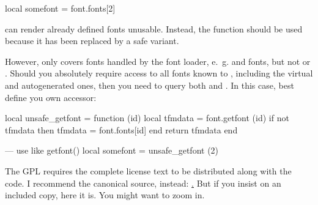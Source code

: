 \beginlisting
    local somefont = font.fonts[2]
\endlisting

\noindent can render already defined fonts unusable.
%
Instead, the function  should be used
because it has been replaced by a safe variant.

However,  only covers fonts handled by the
font loader, e.~g.  and 
fonts, but not  or .
%
Should you absolutely require access to all fonts known to \LUATEX,
including the virtual and autogenerated ones, then you need to query
both  and .
%
In this case, best define you own accessor:

\beginlisting
    local unsafe_getfont = function (id)
        local tfmdata = font.getfont (id)
        if not tfmdata then
            tfmdata = font.fonts[id]
        end
        return tfmdata
    end

    --- use like getfont()
    local somefont = unsafe_getfont (2)
\endlisting

\endsubsection
\endsection

\clearpage

The GPL requires the complete license text to be distributed along
with the code. I recommend the canonical source, instead:
\hyperlink {http://www.gnu.org/licenses/old-licenses/gpl-2.0.html}.
But if you insist on an included copy, here it is.
You might want to zoom in.

